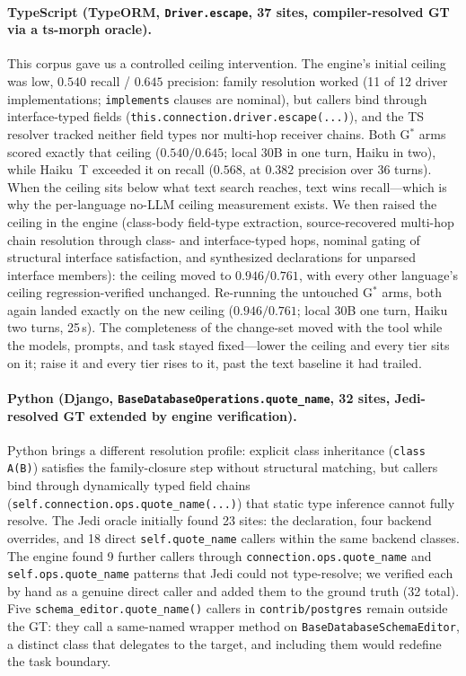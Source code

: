 \documentclass[11pt]{article}
\newcommand{\code}[1]{\texttt{#1}}
\newcommand{\gstar}{G$^{*}$}
\begin{document}
\paragraph{TypeScript (TypeORM, \code{Driver.escape}, 37 sites,
compiler-resolved GT via a ts-morph oracle).} This corpus gave us a
controlled ceiling intervention. The engine's initial
ceiling was low, $0.540$ recall / $0.645$ precision: family resolution
worked (11 of 12 driver implementations; \code{implements} clauses are
nominal), but callers bind through interface-typed fields
(\code{this.connection.driver.escape(...)}), and the TS resolver tracked
neither field types nor multi-hop receiver chains. Both \gstar{} arms
scored exactly that ceiling ($0.540/0.645$; local 30B in one turn, Haiku
in two), while Haiku~T exceeded it on recall ($0.568$, at $0.382$
precision over 36 turns). When the ceiling sits below what text search
reaches, text wins recall---which is why the per-language no-LLM ceiling
measurement exists. We then raised the ceiling in the engine (class-body
field-type extraction, source-recovered multi-hop chain resolution
through class- and interface-typed hops, nominal gating of structural
interface satisfaction, and synthesized declarations for unparsed
interface members): the ceiling moved to $0.946/0.761$, with every other
language's ceiling regression-verified unchanged. Re-running the
untouched \gstar{} arms, both again landed exactly on the new ceiling
($0.946/0.761$; local 30B one turn, Haiku two turns, 25\,s). The
completeness of the change-set moved with the tool while the models,
prompts, and task stayed fixed---lower the ceiling and every
tier sits on it; raise it and every tier rises to it, past the text
baseline it had trailed.

\paragraph{Python (Django, \code{BaseDatabaseOperations.quote\_name}, 32
sites, Jedi-resolved GT extended by engine verification).} Python
brings a different resolution profile: explicit class inheritance
(\code{class A(B)}) satisfies the family-closure step without structural
matching, but callers bind through dynamically typed field chains
(\code{self.connection.ops.quote\_name(...)}) that static type inference
cannot fully resolve. The Jedi oracle initially found 23 sites: the
declaration, four backend overrides, and 18 direct \code{self.quote\_name}
callers within the same backend classes. The engine found 9 further callers
through \code{connection.ops.quote\_name} and \code{self.ops.quote\_name}
patterns that Jedi could not type-resolve; we verified each by hand as a
genuine direct caller and added them to the ground truth (32 total). Five
\code{schema\_editor.quote\_name()} callers in \code{contrib/postgres}
remain outside the GT: they call a same-named wrapper method on
\code{BaseDatabaseSchemaEditor}, a distinct class that delegates to the
target, and including them would redefine the task boundary.
\end{document}
